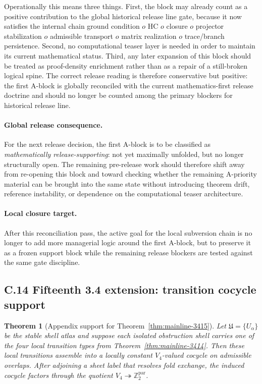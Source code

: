 \documentclass[12pt,a4paper]{article}
\DeclareRobustCommand{\QSCver}[1]{archival stage}
\newtheorem{theorem}{Theorem}[section]
\renewcommand{\QSCver}[1]{historical release line}
\begin{document}
Operationally this means three things. First, the block may already count as a positive contribution to the global \QSCver{v2.27.0} gate, because it now satisfies the internal chain ground condition $	o$ HC $	o$ closure $	o$ projector stabilization $	o$ admissible transport $	o$ matrix realization $	o$ trace/branch persistence. Second, no computational teaser layer is needed in order to maintain its current mathematical status. Third, any later expansion of this block should be treated as proof-density enrichment rather than as a repair of a still-broken logical spine. The correct release reading is therefore conservative but positive: the first A-block is globally reconciled with the current mathematics-first release doctrine and should no longer be counted among the primary blockers for \QSCver{v2.27.0}.

\paragraph{Global release consequence.}
For the next release decision, the first A-block is to be classified as \emph{mathematically release-supporting}: not yet maximally unfolded, but no longer structurally open. The remaining pre-release work should therefore shift away from re-opening this block and toward checking whether the remaining A-priority material can be brought into the same state without introducing theorem drift, reference instability, or dependence on the computational teaser architecture.

\paragraph{Local closure target.}
After this reconciliation pass, the active goal for the local subversion chain is no longer to add more managerial logic around the first A-block, but to preserve it as a frozen support block while the remaining release blockers are tested against the same gate discipline.



\subsection*{C.14 Fifteenth 3.4 extension: transition cocycle support}

\begin{theorem}[Appendix support for Theorem~\ref{thm:mainline-3415}]
\label{thm:appendix-3415}
Let $\mathfrak U=\{U_\alpha\}$ be the stable shell atlas and suppose each isolated obstruction shell carries one of the four local transition types from Theorem~\ref{thm:mainline-3414}. Then these local transitions assemble into a locally constant $V_4$-valued cocycle on admissible overlaps. After adjoining a sheet label that resolves fold exchange, the induced cocycle factors through the quotient $V_4\twoheadrightarrow \mathbb Z_2^{\mathrm{par}}$.
\end{theorem}
\end{document}
